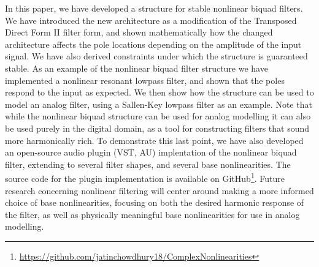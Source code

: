 \documentclass[twoside,a4paper]{article}
\begin{document}
In this paper, we have developed a structure for stable nonlinear biquad
filters. We have introduced the new architecture as a modification of the
Transposed Direct Form II filter form, and shown mathematically
how the changed architecture affects the pole locations depending on
the amplitude of the input signal. We have also derived constraints under
which the structure is guaranteed stable.
\newline\newline
As an example of the nonlinear biquad filter structure we have implemented
a nonlinear resonant lowpass filter, and shown that the poles respond to
the input as expected. We then show how the structure can be used to model
an analog filter, using a Sallen-Key lowpass filter as an example. Note
that while the nonlinear biquad structure can be used for analog modelling
it can also be used purely in the digital domain, as a tool for constructing
filters that sound more harmonically rich.
\newline\newline
To demonstrate this last point, we have also developed an open-source
audio plugin (VST, AU) implentation of the nonlinear biquad filter,
extending to several filter shapes, and several base nonlinearities.
The source code for the plugin implementation is available on
GitHub\footnote{\url{https://github.com/jatinchowdhury18/ComplexNonlinearities}}.
\newline\newline
Future research concerning nonlinear filtering will center around making a
more informed choice of base nonlinearities, focusing on both the desired
harmonic response of the filter, as well as physically meaningful base
nonlinearities for use in analog modelling.

\nocite{*}


\end{document}
